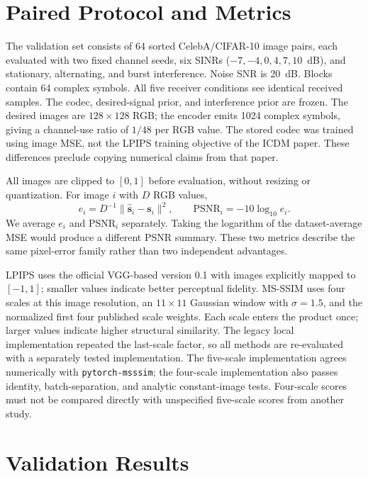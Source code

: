 \documentclass[conference]{IEEEtran}
\begin{document}
\section{Paired Protocol and Metrics}
The validation set consists of 64 sorted CelebA/CIFAR-10 image pairs, each
evaluated with two fixed channel seeds, six SINRs ($-7,-4,0,4,7,10$~dB), and
stationary, alternating, and burst interference. Noise SNR is 20~dB. Blocks
contain 64 complex symbols. All five receiver conditions see identical received
samples. The codec, desired-signal prior, and interference prior are frozen.
The desired images are $128\times128$ RGB; the encoder emits 1024 complex
symbols, giving a channel-use ratio of $1/48$ per RGB value. The stored codec
was trained using image MSE, not the LPIPS training objective of the ICDM
paper. These differences preclude copying numerical claims from that paper.

All images are clipped to $[0,1]$ before evaluation, without resizing or
quantization. For image $i$ with $D$ RGB values,
\begin{equation}
 e_i=D^{-1}\lVert\hat{\boldsymbol{s}}_i-\boldsymbol{s}_i\rVert^2,
 \qquad \mathrm{PSNR}_i=-10\log_{10}e_i.
\end{equation}
We average $e_i$ and $\mathrm{PSNR}_i$ separately. Taking the logarithm of the
dataset-average MSE would produce a different PSNR summary. These two metrics
describe the same pixel-error family rather than two independent advantages.

LPIPS uses the official VGG-based version 0.1 with images explicitly mapped
to $[-1,1]$; smaller values indicate better perceptual fidelity. MS-SSIM uses
four scales at this image resolution, an $11\times11$ Gaussian window with
$\sigma=1.5$, and the normalized first four published scale weights.
Each scale enters the product once; larger values indicate higher structural
similarity. The legacy local implementation repeated the last-scale factor,
so all methods are re-evaluated with a separately tested implementation.
The five-scale implementation agrees numerically with \texttt{pytorch-msssim};
the four-scale implementation also passes identity, batch-separation, and
analytic constant-image tests. Four-scale scores must not be compared directly
with unspecified five-scale scores from another study.

\section{Validation Results}

\end{document}
